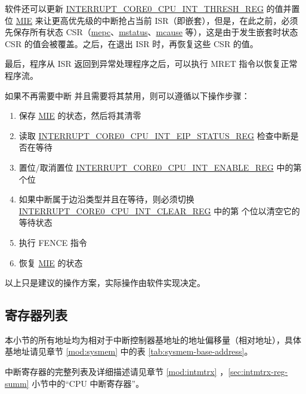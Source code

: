 \documentclass[main\_\_CN.tex]{subfiles}
\begin{document}
软件还可以更新 \hyperref[regdesc:INTERRUPTCORE0CPUINTTHRESHREG]{INTERRUPT\_CORE0\_CPU\_INT\_THRESH\_REG} 的值并置位 \hyperref[fielddesc:MSTATUSMIE]{MIE} 来让更高优先级的中断抢占当前 ISR（即嵌套），但是，在此之前，必须先保存所有状态 CSR（\hyperref[regdesc:MEPC]{mepc}、\hyperref[regdesc:MSTATUS]{mstatus}、\hyperref[regdesc:MCAUSE]{mcause} 等），这是由于发生嵌套时状态 CSR 的值会被覆盖。之后，在退出 ISR 时，再恢复这些 CSR 的值。

最后，程序从 ISR 返回到异常处理程序之后，可以执行 MRET 指令以恢复正常程序流。

如果不再需要中断  并且需要将其禁用，则可以遵循以下操作步骤：
\begin{enumerate}
    \item 保存 \hyperref[fielddesc:MSTATUSMIE]{MIE} 的状态，然后将其清零
    \item 读取 \hyperref[regdesc:INTERRUPTCORE0CPUINTEIPSTATUSREG]{INTERRUPT\_CORE0\_CPU\_INT\_EIP\_STATUS\_REG} 检查中断是否在等待
    \item 置位/取消置位 \hyperref[regdesc:INTERRUPTCORE0CPUINTENABLEREG]{INTERRUPT\_CORE0\_CPU\_INT\_ENABLE\_REG} 中的第  个位
    \item 如果中断属于边沿类型并且在等待，则必须切换 \hyperref[regdesc:INTERRUPTCORE0CPUINTCLEARREG]{INTERRUPT\_CORE0\_CPU\_INT\_CLEAR\_REG} 中的第  个位以清空它的等待状态
    \item 执行 FENCE 指令
    \item 恢复 \hyperref[fielddesc:MSTATUSMIE]{MIE} 的状态
\end{enumerate}

以上只是建议的操作方案，实际操作由软件实现决定。


\hypertarget{riscvcpu-int-reg-summ}{}
\subsection{寄存器列表}
\label{sec:riscvcpu-int-reg-summ}


本小节的所有地址均为相对于中断控制器基地址的地址偏移量（相对地址），具体基地址请见章节 \ref{mod:sysmem} \textit{} 中的表 \ref{tab:sysmem-base-address}。

中断寄存器的完整列表及详细描述请见章节 \ref{mod:intmtrx} \textit{}，\ref{sec:intmtrx-reg-summ} 小节中的“CPU 中断寄存器”。
\end{document}
